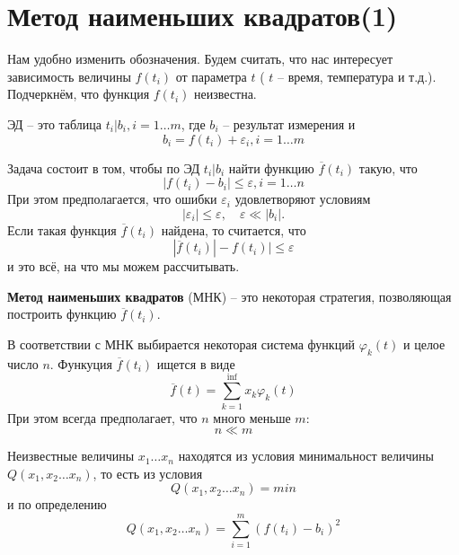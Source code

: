 \section{Метод наименьших квадратов(1)}
Нам удобно изменить обозначения. Будем считать, что нас интересует зависимость величины $f(t_i)$ от параметра  $t$ ( $t$ -- время, температура и т.д.). Подчеркнём, что функция $f(t_i)$ неизвестна.

ЭД -- это таблица $t_i | b_i, i = 1 \dots m$, где $b_i$ -- результат измерения и 
\begin{equation}
	b_i = f(t_i) + \varepsilon_i, i = 1 \dots m
\end{equation}

Задача состоит в том, чтобы по ЭД  $t_i | b_i$ найти функцию $\overline f(t_i)$ такую, что 
\begin{equation}
	|f(t_i) - b_i| \leq \varepsilon,  i = 1 \dots n
\end{equation}
При этом предполагается, что ошибки $\varepsilon_i$ удовлетворяют условиям
\begin{equation}
	|\varepsilon_i | \leq \varepsilon , \quad \varepsilon \ll  |b_i| .
\end{equation}
Если такая функция $\overline f(t_i)$ найдена, то считается, что
\begin{equation}
	|\overline f(t_i)| - f(t_i) | \leq \varepsilon
\end{equation}
и это всё, на что мы можем рассчитывать.

\vspace{1cm}
\textbf{Метод наименьших квадратов} (МНК) --  это некоторая стратегия, позволяющая построить функцию $\overline f(t_i)$.

В соответствии с МНК выбирается некоторая система функций $\varphi_k (t) $ и целое число $n$. Функуция $\overline f(t_i)$ ищется в виде 
\begin{equation}
	\overline{f} (t) = \sum_{k=1}^\inf {x_k \varphi_k (t) }
\end{equation}
При этом всегда предполагает, что $n$ много меньше $m$:
\begin{equation}
	n \ll m
\end{equation}

Неизвестные величины $x_1 \dots x_n$ находятся из условия минимальност величины $Q(x_1, x_2 \dots x_n)$, то есть из условия
\begin{equation} \label{eq:5.7}
	Q(x_1, x_2 \dots x_n) = min
\end{equation}
и по определению
\begin{equation} 
	Q(x_1, x_2 \dots x_n) = \sum_{i=1}^m {(f(t_i) - b_i)^2}
\end{equation}

